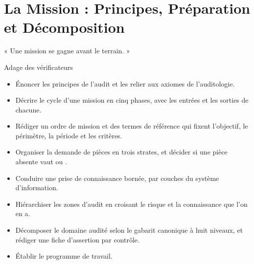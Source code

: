 
\chapter[La mission : principes, préparation, décomposition]{La Mission : Principes, Préparation et Décomposition}
\label{chap:preparer}

\epigraph{%
    « Une mission se gagne avant le terrain. »%
}{Adage des vérificateurs}


\begin{boxobjectifs}
\begin{itemize}
    \item Énoncer les principes de l'audit et les relier aux axiomes de
          l'auditologie.
    \item Décrire le cycle d'une mission en cinq phases, avec les entrées et
          les sorties de chacune.
    \item Rédiger un ordre de mission et des termes de référence qui fixent
          l'objectif, le périmètre, la période et les critères.
    \item Organiser la demande de pièces en trois strates, et décider si une
          pièce absente vaut \NON{} ou \NEK{}.
    \item Conduire une prise de connaissance bornée, par couches du système
          d'information.
    \item Hiérarchiser les zones d'audit en croisant le risque et la
          connaissance que l'on en a.
    \item Décomposer le domaine audité selon le gabarit canonique à huit
          niveaux, et rédiger une fiche d'assertion par contrôle.
    \item Établir le programme de travail.
\end{itemize}
\end{boxobjectifs}

